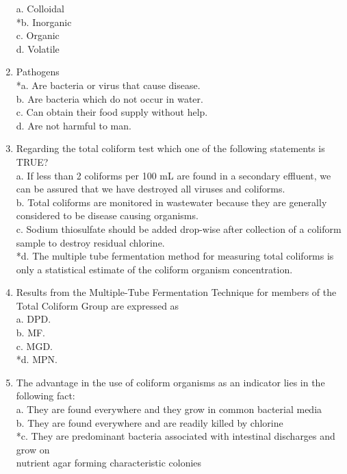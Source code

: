 \begin{enumerate}
a. Colloidal \\
*b. Inorganic \\
c. Organic \\
d. Volatile 

\item  Pathogens \\

*a. Are bacteria or virus that cause disease. \\
b. Are bacteria which do not occur in water. \\
c. Can obtain their food supply without help. \\
d. Are not harmful to man. 

\item  Regarding the total coliform test which one of the following statements is TRUE? \\

a. If less than 2 coliforms per 100 mL are found in a secondary effluent, we can be assured that we have destroyed all viruses and coliforms. \\
b. Total coliforms are monitored in wastewater because they are generally considered to be disease causing organisms. \\
c. Sodium thiosulfate should be added drop-wise after collection of a coliform sample to destroy residual chlorine. \\
*d. The multiple tube fermentation method for measuring total coliforms is only a statistical estimate of the coliform organism concentration. 

\item  Results from the Multiple-Tube Fermentation Technique for members of the Total Coliform Group are expressed as \\

a. DPD. \\
b. MF. \\
c. MGD. \\
*d. MPN. 

\item  The advantage in the use of coliform organisms as an indicator lies in the following fact: \\

a. They are found everywhere and they grow in common bacterial media \\
b. They are found everywhere and are readily killed by chlorine \\
*c. They are predominant bacteria associated with intestinal discharges and grow on\\
nutrient agar forming characteristic colonies 


\end{enumerate}

